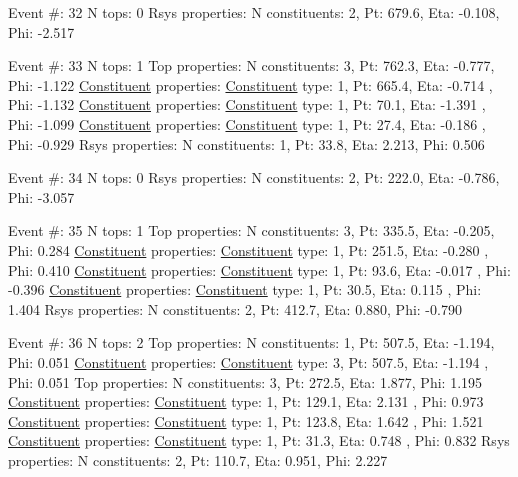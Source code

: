 \begin{DoxyCode}
Event #: 32
      N tops: 0
      Rsys properties: N constituents:   2,   Pt:  679.6,   Eta:  -0.108,   Phi:  -2.517

Event #: 33
      N tops: 1
      Top properties: N constituents:   3,   Pt:  762.3,   Eta:  -0.777,   Phi:  -1.122
          \hyperlink{classConstituent}{Constituent} properties: \hyperlink{classConstituent}{Constituent} type:   1,   Pt:  665.4,   Eta:  -0.714
      ,   Phi:  -1.132
          \hyperlink{classConstituent}{Constituent} properties: \hyperlink{classConstituent}{Constituent} type:   1,   Pt:   70.1,   Eta:  -1.391
      ,   Phi:  -1.099
          \hyperlink{classConstituent}{Constituent} properties: \hyperlink{classConstituent}{Constituent} type:   1,   Pt:   27.4,   Eta:  -0.186
      ,   Phi:  -0.929
      Rsys properties: N constituents:   1,   Pt:   33.8,   Eta:   2.213,   Phi:   0.506

Event #: 34
      N tops: 0
      Rsys properties: N constituents:   2,   Pt:  222.0,   Eta:  -0.786,   Phi:  -3.057

Event #: 35
      N tops: 1
      Top properties: N constituents:   3,   Pt:  335.5,   Eta:  -0.205,   Phi:   0.284
          \hyperlink{classConstituent}{Constituent} properties: \hyperlink{classConstituent}{Constituent} type:   1,   Pt:  251.5,   Eta:  -0.280
      ,   Phi:   0.410
          \hyperlink{classConstituent}{Constituent} properties: \hyperlink{classConstituent}{Constituent} type:   1,   Pt:   93.6,   Eta:  -0.017
      ,   Phi:  -0.396
          \hyperlink{classConstituent}{Constituent} properties: \hyperlink{classConstituent}{Constituent} type:   1,   Pt:   30.5,   Eta:   0.115
      ,   Phi:   1.404
      Rsys properties: N constituents:   2,   Pt:  412.7,   Eta:   0.880,   Phi:  -0.790

Event #: 36
      N tops: 2
      Top properties: N constituents:   1,   Pt:  507.5,   Eta:  -1.194,   Phi:   0.051
          \hyperlink{classConstituent}{Constituent} properties: \hyperlink{classConstituent}{Constituent} type:   3,   Pt:  507.5,   Eta:  -1.194
      ,   Phi:   0.051
      Top properties: N constituents:   3,   Pt:  272.5,   Eta:   1.877,   Phi:   1.195
          \hyperlink{classConstituent}{Constituent} properties: \hyperlink{classConstituent}{Constituent} type:   1,   Pt:  129.1,   Eta:   2.131
      ,   Phi:   0.973
          \hyperlink{classConstituent}{Constituent} properties: \hyperlink{classConstituent}{Constituent} type:   1,   Pt:  123.8,   Eta:   1.642
      ,   Phi:   1.521
          \hyperlink{classConstituent}{Constituent} properties: \hyperlink{classConstituent}{Constituent} type:   1,   Pt:   31.3,   Eta:   0.748
      ,   Phi:   0.832
      Rsys properties: N constituents:   2,   Pt:  110.7,   Eta:   0.951,   Phi:   2.227


\end{DoxyCode}
